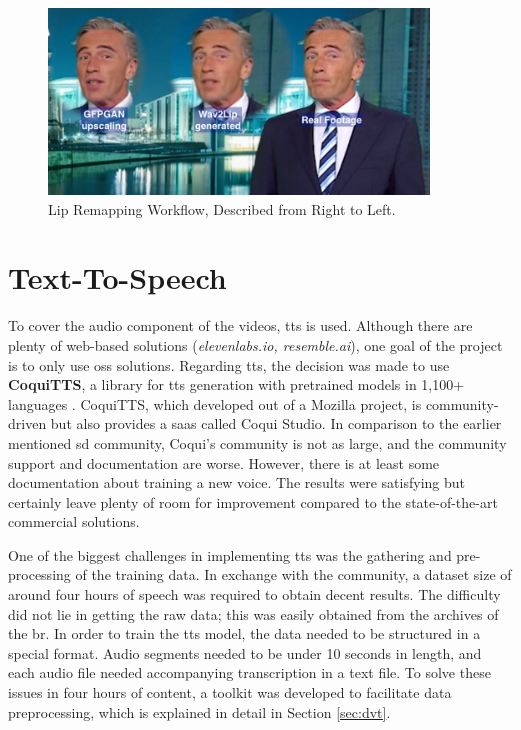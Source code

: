 \documentclass[
  a4paper,  %
  twoside,  %
  bibliography=totoc,
  headsepline,
  cleardoublepage=empty,
  parskip=half,
  draft=false
]{scrbook}
\begin{document}
\begin{figure}[h]
  \centering
  \includegraphics[width=0.9\textwidth]{./graphics/wav2lip/wav2lip-demo.png}
  \caption{Lip Remapping Workflow, Described from Right to Left.}
  \label{fig:wav2lip-demo}
\end{figure}

\section{Text-To-Speech}
\label{sec:tts}
To cover the audio component of the videos, \gls{tts} is used. Although there are plenty of web-based solutions (\textit{elevenlabs.io, resemble.ai}), one goal of the project is to only use \gls{oss} solutions. Regarding \gls*{tts}, the decision was made to use \textbf{CoquiTTS}, a library for \gls{tts} generation with pretrained models in 1,100+ languages \cite{erenCoquiTTS2021}. CoquiTTS, which developed out of a Mozilla project, is community-driven but also provides a \gls{saas} called Coqui Studio. In comparison to the earlier mentioned \gls{sd} community, Coqui's community is not as large, and the community support and documentation are worse. However, there is at least some documentation about training a new voice. The results were satisfying but certainly leave plenty of room for improvement compared to the state-of-the-art commercial solutions.

One of the biggest challenges in implementing \gls{tts} was the gathering and pre-processing of the training data. In exchange with the community, a dataset size of around four hours of speech was required to obtain decent results. The difficulty did not lie in getting the raw data; this was easily obtained from the archives of the \gls{br}. In order to train the \gls{tts} model, the data needed to be structured in a special format. Audio segments needed to be under 10 seconds in length, and each audio file needed accompanying transcription in a text file. To solve these issues in four hours of content, a toolkit was developed to facilitate data preprocessing, which is explained in detail in Section \ref{sec:dvt}.
\end{document}

